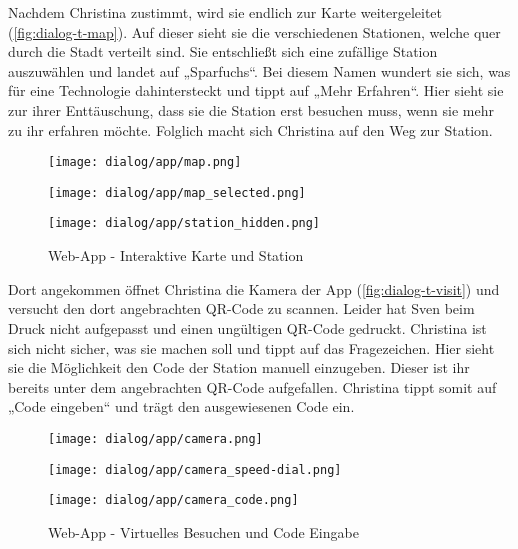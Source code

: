 Nachdem Christina zustimmt, wird sie endlich zur Karte weitergeleitet (\autoref{fig:dialog-t-map}). Auf dieser sieht sie die verschiedenen Stationen,
welche quer durch die Stadt verteilt sind. Sie entschließt sich eine zufällige
Station auszuwählen und landet auf „Sparfuchs“. Bei diesem Namen wundert sie
sich, was für eine Technologie dahintersteckt und tippt auf „Mehr Erfahren“.
Hier sieht sie zur ihrer Enttäuschung, dass sie die Station erst besuchen muss,
wenn sie mehr zu ihr erfahren möchte. Folglich macht sich Christina auf den Weg
zur Station.

\begin{figure}[htpb]
    \centering
    \begin{minipage}{.325\textwidth}
        \centering
        \texttt{[image: dialog/app/map.png]}
    \end{minipage}%
    \begin{minipage}{.325\textwidth}
        \centering
        \texttt{[image: dialog/app/map\_selected.png]}
    \end{minipage}
    \begin{minipage}{.325\textwidth}
        \centering
        \texttt{[image: dialog/app/station\_hidden.png]}
    \end{minipage}
    \caption{Web-App - Interaktive Karte und Station}
    \label{fig:dialog-t-map}
\end{figure}

Dort angekommen öffnet Christina die Kamera der App
(\autoref{fig:dialog-t-visit}) und versucht den dort angebrachten QR-Code zu
scannen. Leider hat Sven beim Druck nicht aufgepasst und einen ungültigen
QR-Code gedruckt. Christina ist sich nicht sicher, was sie machen soll und tippt
auf das Fragezeichen. Hier sieht sie die Möglichkeit den Code der Station
manuell einzugeben. Dieser ist ihr bereits unter dem angebrachten QR-Code
aufgefallen. Christina tippt somit auf „Code eingeben“ und trägt den
ausgewiesenen Code ein.

\begin{figure}[htpb]
    \centering
    \begin{minipage}{.325\textwidth}
        \centering
        \texttt{[image: dialog/app/camera.png]}
    \end{minipage}%
    \begin{minipage}{.325\textwidth}
        \centering
        \texttt{[image: dialog/app/camera\_speed-dial.png]}
    \end{minipage}
    \begin{minipage}{.325\textwidth}
        \centering
        \texttt{[image: dialog/app/camera\_code.png]}
    \end{minipage}
    \caption{Web-App - Virtuelles Besuchen und Code Eingabe}
    \label{fig:dialog-t-visit}
\end{figure}

